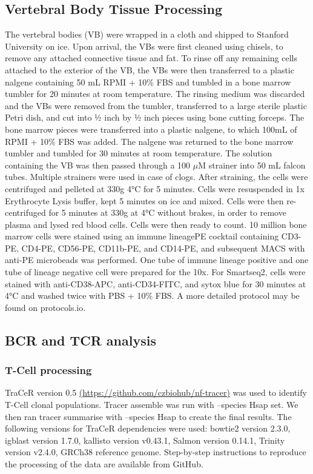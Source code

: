 \subsection{Vertebral Body Tissue Processing}
The vertebral bodies (VB) were wrapped in a cloth and shipped to Stanford University on ice.
Upon arrival, the VBs were first cleaned using chisels, to remove any attached connective tissue
and fat. To rinse off any remaining cells attached to the exterior of the VB, the VBs were then
transferred to a plastic nalgene containing 50 mL RPMI + 10\% FBS and tumbled in a bone marrow
tumbler for 20 minutes at room temperature. The rinsing medium was discarded and the VBs
were removed from the tumbler, transferred to a large sterile plastic Petri dish, and cut into ½ inch
by ½ inch pieces using bone cutting forceps. The bone marrow pieces were transferred into a
plastic nalgene, to which 100mL of RPMI + 10\% FBS was added. The nalgene was returned to
the bone marrow tumbler and tumbled for 30 minutes at room temperature. The solution
containing the VB was then passed through a 100 $\mu$M strainer into 50 mL falcon tubes. Multiple
strainers were used in case of clogs. After straining, the cells were centrifuged and pelleted at
330g 4°C for 5 minutes. Cells were resuspended in 1x Erythrocyte Lysis buffer, kept 5 minutes
on ice and mixed. Cells were then re-centrifuged for 5 minutes at 330g at 4°C without brakes, in
order to remove plasma and lysed red blood cells. Cells were then ready to count. 10 million bone
marrow cells were stained using an immune lineagePE cocktail containing CD3-PE, CD4-PE,
CD56-PE, CD11b-PE, and CD14-PE, and subsequent MACS with anti-PE microbeads was
performed. One tube of immune lineage positive and one tube of lineage negative cell were
prepared for the 10x. For Smartseq2, cells were stained with anti-CD38-APC, anti-CD34-FITC,
and sytox blue for 30 minutes at 4°C and washed twice with PBS + 10\% FBS. A more detailed protocol may be found on protocols.io. 
\subsection{BCR and TCR analysis}
\subsubsection{T-Cell processing}
TraCeR\cite{stubbington_t_2016} version 0.5 \url{(https://github.com/czbiohub/nf-tracer)} was used to identify T-Cell clonal
populations. Tracer assemble was run with --species Hsap set. We then ran tracer summarise
with --species Hsap to create the final results. The following versions for TraCeR dependencies
were used: bowtie2 version 2.3.0, igblast version 1.7.0, kallisto version v0.43.1, Salmon version
0.14.1, Trinity version v2.4.0, GRCh38 reference genome. Step-by-step instructions to reproduce
the processing of the data are available from GitHub.
